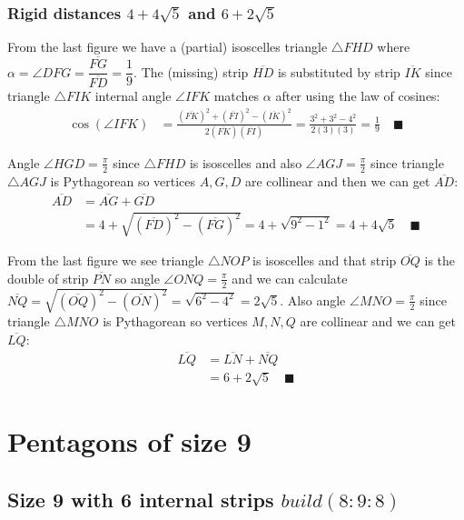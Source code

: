 \documentclass[11pt]{article}
\begin{document}
\subsubsection{Rigid distances $4 + 4\sqrt5$ and $6 + 2\sqrt5$}

From the last figure we have a (partial) isoscelles triangle $\triangle{FHD}$ where $\alpha = \angle{DFG} = \dfrac{\overline{FG}}{\overline{FD}} = \dfrac{1}9$. The (missing) strip $\overline{HD}$ is substituted by strip $\overline{IK}$ since triangle $\triangle{FIK}$ internal angle $\angle{IFK}$ matches $\alpha$ after using the law of cosines:
\begin{align}
\cos(\angle{IFK}) &= \frac{(\overline{FK})^2 + (\overline{FI})^2 - (\overline{IK})^2}
 {2(\overline{FK})(\overline{FI})} 
 = \frac{3^2 + 3^2 - 4^2}{2(3)(3)}
= \frac{1}9 \quad \blacksquare
\end{align}

Angle $\angle{HGD}=\frac{\pi}2$ since $\triangle{FHD}$ is isoscelles and also $\angle{AGJ} = \frac{\pi}2$ since triangle $\triangle{AGJ}$ is Pythagorean so vertices $A,G,D$ are collinear and then we can get $\overline{AD}$:
\begin{align}
\overline{AD} &= \overline{AG} + \overline{GD} \nonumber\\
 &= 4 + \sqrt{(\overline{FD})^2 - (\overline{FG})^2}
 = 4 + \sqrt{9^2 - 1^2} = 4 + 4\sqrt5 \quad \blacksquare
\end{align}

From the last figure we see triangle $\triangle{NOP}$ is isoscelles and that strip $\overline{OQ}$ is the double of strip $\overline{PN}$ so angle $\angle{ONQ} = \frac{\pi}2$ and we can calculate $\overline{NQ} = \sqrt{(\overline{OQ})^2 - (\overline{ON})^2} = \sqrt{6^2 - 4^2} = 2\sqrt5$. Also angle $\angle{MNO} = \frac{\pi}2$ since triangle $\triangle{MNO}$ is Pythagorean so vertices $M,N,Q$ are collinear and we can get $\overline{LQ}$:
\begin{align}
\overline{LQ} &= \overline{LN} + \overline{NQ} \nonumber\\
 &= 6 + 2\sqrt5 \quad \blacksquare
\end{align}



\section{Pentagons of size 9}

\subsection{Size 9 with 6 internal strips $build(8:9:8)$}
\end{document}
